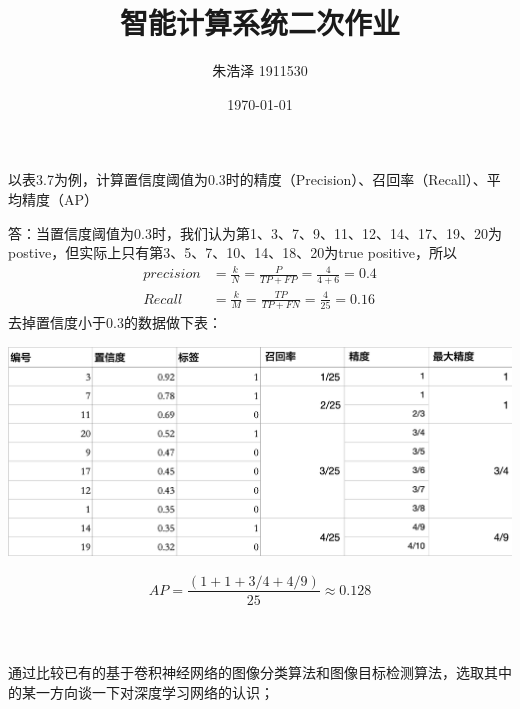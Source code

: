 \documentclass{homework}
\author{朱浩泽 1911530}
\date{\today}
\title{\Large{智能计算系统二次作业}}
\begin{document}
 \maketitle

\question \large{以表3.7为例，计算置信度阈值为0.3时的精度（Precision）、召回率（Recall）、平均精度（AP）}

\normalsize
答：当置信度阈值为0.3时，我们认为第1、3、7、9、11、12、14、17、19、20为postive，但实际上只有第3、5、7、10、14、18、20为true positive，所以
\begin{align*}
	precision &= \frac{k}{N} = \frac{P}{TP+FP} = \frac{4}{4 + 6} = 0.4\\
	Recall &= \frac{k}{M} = \frac{TP}{TP+FN} = \frac{4}{25} = 0.16
\end{align*}
去掉置信度小于0.3的数据做下表：
\begin{center}
	\includegraphics[scale = 0.5]{1.png}
\end{center}
$$
AP = \frac{(1 + 1 + 3/4 + 4/9)}{25}\approx 0.128 
$$
~\\ 
~\\
~\\ 
\question \large{通过比较已有的基于卷积神经网络的图像分类算法和图像目标检测算法，选取其中的某一方向谈一下对深度学习网络的认识；}
\end{document}

